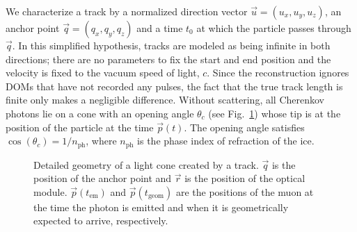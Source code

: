 We characterize a track by a normalized direction vector $\vec{u}=(u_{x},u_{y},u_{z})$,
an anchor point $\vec{q}=(q_{x},q_{y},q_{z})$ and a time $t_{0}$
at which the particle passes through $\vec{q}$. In this simplified
hypothesis, tracks are modeled as being infinite in both directions;
there are no parameters to fix the start and end position and the
velocity is fixed to the vacuum speed of light, $c$. Since the reconstruction ignores DOMs that have not recorded any pulses, the fact that the true track length is finite only makes a negligible  difference.
Without scattering, all Cherenkov photons lie on a cone with an opening
angle $\theta_{c}$ (see Fig.~\ref{fig:Detailed-track-geometry})
whose tip is at the position of the particle at the time $\vec{p}(t)$. The opening angle satisfies $\cos(\theta_c)=1/n_{\mathrm{ph}}$, where $n_{\mathrm{ph}}$ is the phase index of refraction of the ice.

\begin{figure}[h]
\begin{centering}
\par
\end{centering}
\caption{\label{fig:Detailed-track-geometry}Detailed geometry of a light cone
created by a track. $\vec{q}$ is the position of the anchor point
and $\vec{r}$ is the position of the optical module. $\vec{p}(t_{\mathrm{em}})$
and $\vec{p}(t_{\mathrm{geom}})$ are the positions of the muon at
the time the photon is emitted and when it is geometrically expected
to arrive, respectively.}
\end{figure}



